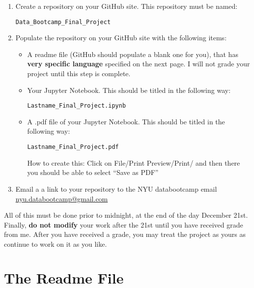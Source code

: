 \begin{enumerate}

\item Create a repository on your GitHub site. This repository must be named:

 {\tt Data\_Bootcamp\_Final\_Project}

 \bigskip

\item Populate the repository on your GitHub site with the following items:
\begin{itemize}

\item A readme file (GitHub should populate a blank one for you), that has \textbf{very specific language} specified on the next page. I will not grade your project until this step is complete.

\bigskip

\item Your Jupyter Notebook. This should be titled in the following way:

 {\tt Lastname\_Final\_Project.ipynb}

\bigskip

\item A .pdf file of your Jupyter Notebook. This should be titled in the following way:

 {\tt Lastname\_Final\_Project.pdf}

How to create this: Click on File/Print Preview/Print/ and then there you should be able to select ``Save as PDF''

\end{itemize}

\bigskip

\item Email a a link to your repository to the NYU databootcamp email \href{mailto:nyu.databootcamp@gmail.com}{nyu.databootcamp@gmail.com}

\end{enumerate}

All of this must be done prior to midnight, at the end of the day December 21st. Finally, \textbf{do not modify} your work after the 21st until you have received grade from me. After you have received a grade, you may treat the project as yours as continue to work on it as you like.

\section*{The Readme File}

